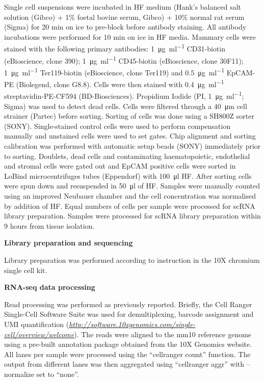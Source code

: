 \documentclass[titlepage, 12pt, oneside]{amsart}
\begin{document}
Single cell suspensions were incubated in HF medium (Hank's balanced salt solution (Gibco) + 1\% foetal bovine serum, Gibco) + 10\% normal rat serum (Sigma) for 20 min on ice to pre-block before antibody staining.
All antibody incubations were performed for 10 min on ice in HF media.
Mammary cells were stained with the following primary antibodies: \SI{1}{\micro\gram\per\milli\litre} CD31-biotin (eBioscience, clone 390); \SI{1}{\micro\gram\per\milli\litre} CD45-biotin (eBioscience, clone 30F11); \SI{1}{\micro\gram\per\milli\litre} Ter119-biotin (eBioscience, clone Ter119) and \SI{0.5}{\micro\gram\per\milli\litre} EpCAM-PE (Biolegend, clone G8.8).
Cells were then stained with \SI{0.4}{\micro\gram\per\milli\litre} streptavidin-PE-CF594 (BD-Biosciences).
Propidium Iodide (PI, \SI{1}{\micro\gram\per\milli\litre}; Sigma) was used to detect dead cells.
Cells were filtered through a \SI{40}{\micro\meter} cell strainer (Partec) before sorting.
Sorting of cells was done using a SH800Z sorter (SONY).
Single-stained control cells were used to perform compensation manually and unstained cells were used to set gates.
Chip alignment and sorting calibration was performed with automatic setup beads (SONY) immediately prior to sorting.
Doublets, dead cells and contaminating haematopoietic, endothelial and stromal cells were gated out and EpCAM positive cells were sorted in LoBind\textsuperscript{\textregistered} microcentrifuges tubes (Eppendorf) with \SI{100}{\micro\litre} HF.
After sorting cells were spun down and resuspended in \SI{50}{\micro\litre} of HF. 
Samples were manually counted using an improved Neubauer chamber and the cell concentration was normalised by addition of HF.
Equal numbers of cells per sample were processed for scRNA library preparation.
Samples were processed for scRNA library preparation within 9 hours from tissue isolation.

\textbf{Library preparation and sequencing}

Library preparation was performed according to instruction in the 10X chromium single cell kit.

\textbf{RNA-seq data processing }

Read processing was performed as previously reported\autocite{Zheng2017}.
Briefly, the Cell Ranger Single-Cell Software Suite was used for demultiplexing, barcode assignment and UMI quantification (\href{http://software.10xgenomics.com/single-cell/overview/welcome}{\textit{http://software.10xgenomics.com/single-cell/overview/welcome}}).
The reads were aligned to the mm10 reference genome using a pre-built annotation package obtained from the 10X Genomics website.
All lanes per sample were processed using the ``cellranger count'' function.
The output from different lanes was then aggregated using ``cellranger aggr'' with --normalize set to ``none''.
\end{document}
